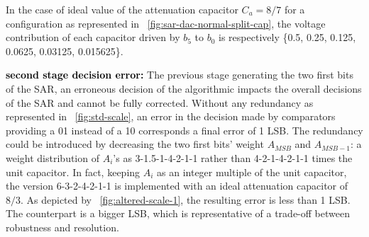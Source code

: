 In the case of ideal value of the attenuation capacitor $C_a = 8/7$ for a configuration as represented in \figurename~\ref{fig:sar-dac-normal-split-cap}, the voltage contribution of each capacitor driven by $b_5$ to $b_0$ is respectively \{0.5, 0.25, 0.125, 0.0625, 0.03125, 0.015625\}.

\textbf{\textcolor{black}{second stage decision error:}}
The previous stage generating the two first bits of the SAR, an erroneous decision of the algorithmic impacts the overall decisions of the SAR and cannot be fully corrected. Without any redundancy as represented in \figurename~\ref{fig:std-scale}, an error in the decision made by comparators providing a 01 instead of a 10 corresponds a final error of 1 LSB\@. The redundancy could be introduced by decreasing the two first bits’ weight \(A_{MSB}\) and \(A_{MSB-1}\): a weight distribution of \(A_i\)'s as 3-1.5-1-4-2-1-1 rather than 4-2-1-4-2-1-1 times the unit capacitor. In fact, keeping \(A_i\) as an integer multiple of the unit capacitor, the version 6-3-2-4-2-1-1 is implemented with an ideal attenuation capacitor of \(8/3\). As depicted by \figurename~\ref{fig:altered-scale-1}, the resulting error is less than 1 LSB\@. The counterpart is a bigger LSB, which is representative of a trade-off between robustness and resolution. 

